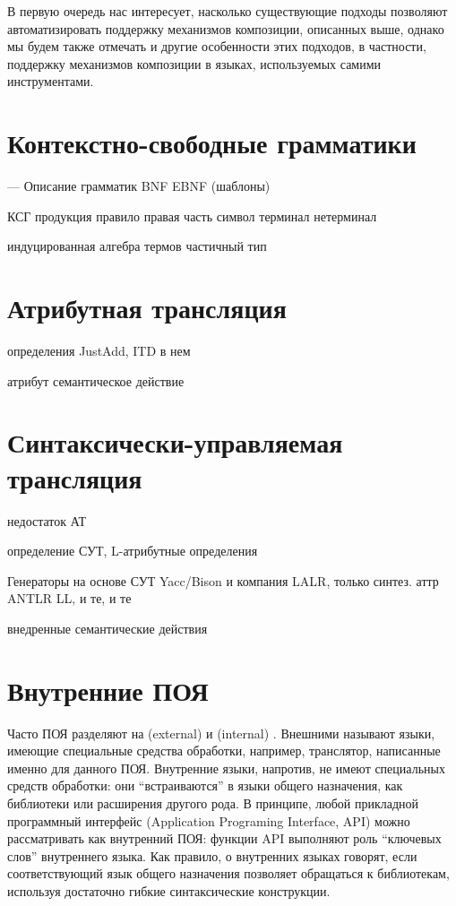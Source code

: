 В первую очередь нас интересует, насколько существующие подходы позволяют автоматизировать поддержку механизмов композиции, описанных выше, однако мы будем также отмечать и другие особенности этих подходов, в частности, поддержку механизмов композиции в языках, используемых самими инструментами.

\section{Контекстно-свободные грамматики}

--- Описание грамматик
	BNF
	EBNF (шаблоны)
	
	КСГ
	продукция 
	правило 
	правая часть 
	символ 
	терминал 
	нетерминал

	индуцированная алгебра термов
	частичный тип

\section{Атрибутная трансляция}

определения
JustAdd, ITD в нем

	атрибут
	семантическое действие

\section{Синтаксически-управляемая трансляция}

недостаток АТ

определение СУТ, L-атрибутные определения

Генераторы на основе СУТ
	Yacc/Bison и компания
		LALR, только синтез. аттр
	ANTLR
		LL, и те, и те
		
	внедренные семантические действия
				
\section{Внутренние ПОЯ}

Часто ПОЯ разделяют на  (external) и  (internal) \cite{???}. Внешними называют языки, имеющие специальные средства обработки, например, транслятор, написанные именно для данного ПОЯ. Внутренние языки, напротив, не имеют специальных средств обработки: они ``встраиваются'' в языки общего назначения, как библиотеки или расширения другого рода. В принципе, любой прикладной программный интерфейс (Application Programing Interface, API) можно рассматривать как внутренний ПОЯ: функции API выполняют роль ``ключевых слов'' внутреннего языка. Как правило, о внутренних языках говорят, если соответствующий язык общего назначения позволяет обращаться к библиотекам, используя достаточно гибкие синтаксические конструкции.

